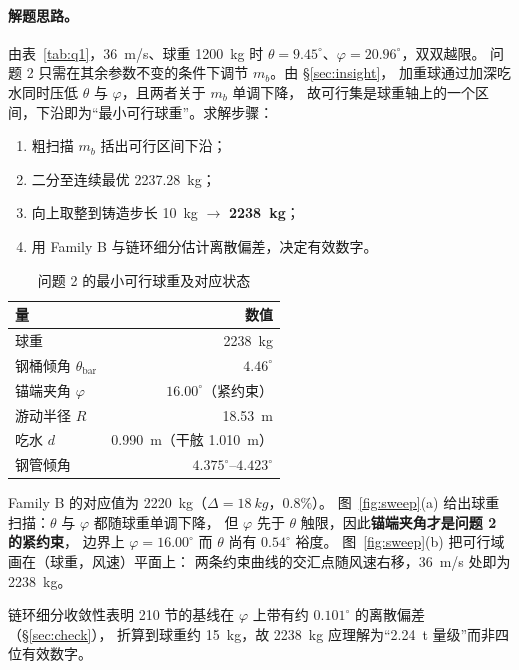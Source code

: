 \documentclass[UTF8,a4paper,zihao=-4]{ctexart}
\begin{document}
\paragraph{解题思路。}
由表~\ref{tab:q1}，\SI{36}{m/s}、球重 \SI{1200}{kg} 时 \(\theta=9.45^\circ\)、\(\varphi=20.96^\circ\)，双双越限。
问题 2 只需在其余参数不变的条件下调节 \(m_b\)。由 \S\ref{sec:insight}，
加重球通过加深吃水同时压低 \(\theta\) 与 \(\varphi\)，且两者关于 \(m_b\) 单调下降，
故可行集是球重轴上的一个区间，下沿即为“最小可行球重”。求解步骤：
\begin{enumerate}[leftmargin=1.6em,itemsep=0.12em]
  \item 粗扫描 \(m_b\) 括出可行区间下沿；
  \item 二分至连续最优 \SI{2237.28}{kg}；
  \item 向上取整到铸造步长 \SI{10}{kg} \(\to\) \textbf{\SI{2238}{kg}}；
  \item 用 Family B 与链环细分估计离散偏差，决定有效数字。
\end{enumerate}

\begin{table}[H]
\centering
\caption{问题 2 的最小可行球重及对应状态}
\label{tab:q2}
\begin{tabular}{lr}
\toprule
量 & 数值 \\
\midrule
球重 & \SI{2238}{kg} \\
钢桶倾角 \(\theta_{\mathrm{bar}}\) & \(4.46^\circ\) \\
锚端夹角 \(\varphi\) & \(16.00^\circ\)（紧约束） \\
游动半径 \(R\) & \SI{18.53}{m} \\
吃水 \(d\) & \SI{0.990}{m}（干舷 \SI{1.010}{m}） \\
钢管倾角 & \(4.375^\circ\)--\(4.423^\circ\) \\
\bottomrule
\end{tabular}
\end{table}

Family B 的对应值为 \SI{2220}{kg}（\(\Delta=\SI{18}{kg}\)，0.8\%）。
图~\ref{fig:sweep}(a) 给出球重扫描：\(\theta\) 与 \(\varphi\) 都随球重单调下降，
但 \(\varphi\) 先于 \(\theta\) 触限，因此\textbf{锚端夹角才是问题 2 的紧约束}，
边界上 \(\varphi=16.00^\circ\) 而 \(\theta\) 尚有 \(0.54^\circ\) 裕度。
图~\ref{fig:sweep}(b) 把可行域画在（球重，风速）平面上：
两条约束曲线的交汇点随风速右移，\SI{36}{m/s} 处即为 \SI{2238}{kg}。

链环细分收敛性表明 210 节的基线在 \(\varphi\) 上带有约 \(0.101^\circ\) 的离散偏差（\S\ref{sec:check}），
折算到球重约 \SI{15}{kg}，故 \SI{2238}{kg} 应理解为“\SI{2.24}{t} 量级”而非四位有效数字。
\end{document}
